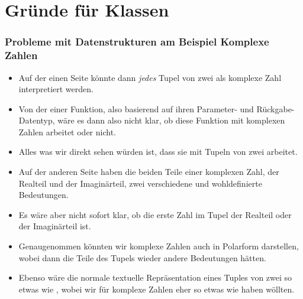 \documentclass[aspectratio=169,mathserif,notheorems]{beamer}%
\begin{document}
\section{Gründe für Klassen}%
%
\begin{frame}[t]%
\frametitle{Probleme mit Datenstrukturen am Beispiel Komplexe Zahlen}%
\begin{itemize}%
%
%
%
%
%
%
%
%
\item<5-> Auf der einen Seite könnte dann \emph{jedes} Tupel von zwei  als komplexe Zahl interpretiert werden.%
%
\item<6-> Von der  einer Funktion, also basierend auf ihren Parameter- und Rückgabe-Datentyp, wäre es dann also nicht klar, ob diese Funktion mit komplexen Zahlen arbeitet oder nicht.%
%
\item<7-> Alles was wir direkt sehen würden ist, dass sie mit Tupeln von zwei  arbeitet.%
%
\item<8-> Auf der anderen Seite haben die beiden Teile einer komplexen Zahl, der Realteil und der Imaginärteil, zwei verschiedene und wohldefinierte Bedeutungen.%
%
\item<9-> Es wäre aber nicht sofort klar, ob die erste Zahl im Tupel der Realteil oder der Imaginärteil ist.%
%
\item<10-> Genaugenommen könnten wir komplexe Zahlen auch in Polarform darstellen, wobei dann die Teile des Tupels wieder andere Bedeutungen hätten.%
%
\item<11-> Ebenso wäre die normale textuelle Repräsentation eines Tuples von zwei  so etwas wie , wobei wir für komplexe Zahlen eher so etwas wie  haben wöllten.%
\end{itemize}%
\end{frame}%
%
\end{document}
